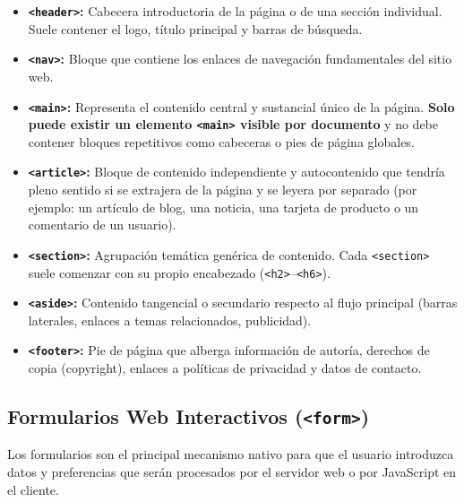 \begin{itemize}[leftmargin=1.2cm]
  \item \textbf{\texttt{<header>}:} Cabecera introductoria de la página o de una sección individual. Suele contener el logo, título principal y barras de búsqueda.
  \item \textbf{\texttt{<nav>}:} Bloque que contiene los enlaces de navegación fundamentales del sitio web.
  \item \textbf{\texttt{<main>}:} Representa el contenido central y sustancial único de la página. \textbf{Solo puede existir un elemento \texttt{<main>} visible por documento} y no debe contener bloques repetitivos como cabeceras o pies de página globales.
  \item \textbf{\texttt{<article>}:} Bloque de contenido independiente y autocontenido que tendría pleno sentido si se extrajera de la página y se leyera por separado (por ejemplo: un artículo de blog, una noticia, una tarjeta de producto o un comentario de un usuario).
  \item \textbf{\texttt{<section>}:} Agrupación temática genérica de contenido. Cada \texttt{<section>} suele comenzar con su propio encabezado (\texttt{<h2>}--\texttt{<h6>}).
  \item \textbf{\texttt{<aside>}:} Contenido tangencial o secundario respecto al flujo principal (barras laterales, enlaces a temas relacionados, publicidad).
  \item \textbf{\texttt{<footer>}:} Pie de página que alberga información de autoría, derechos de copia (copyright), enlaces a políticas de privacidad y datos de contacto.
\end{itemize}

\subsection{Formularios Web Interactivos (\texttt{<form>})}

Los formularios son el principal mecanismo nativo para que el usuario introduzca datos y preferencias que serán procesados por el servidor web o por JavaScript en el cliente.


